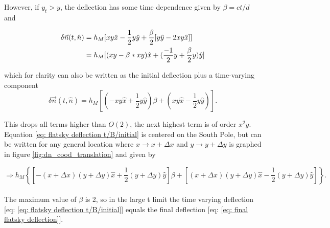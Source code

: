 \documentclass{article}
\begin{document}
However, if $y_t > y$, the deflection has some time dependence given by $\beta = ct/d$ and 

\begin{align}
    \delta\vec{n}(t,\hat{n}) &= h_M[xy\hat{x} - \frac{1}{2}y\hat{y} + \frac{\beta}{2}[y\hat{y}  - 2xy\hat{x}]] \notag \\
    &= h_M[(xy-\beta*xy)\hat{x} + (\frac{-1}{2}y + \frac{\beta}{2}y)\hat{y}] 
    \label{eq: flatsky deflection txy}
\end{align}

which for clarity can also be written as the initial deflection plus a time-varying component 
\begin{equation}
    \delta\vec{n}(t,\hat{n}) = h_M[(-xy\hat{x} + \frac{1}{2}y\hat{y})\beta + (xy\hat{x} - \frac{1}{2}y\hat{y})]. 
    \label{eq: flatsky deflection t/B/initial}
\end{equation}

This drops all terms higher than $O(2)$, the next highest term is of order $x^2y$. Equation \ref{eq: flatsky deflection t/B/initial} is centered on the South Pole, but can be written for any general location where $x \rightarrow x+\Delta x$ and $y \rightarrow y+\Delta y$ is graphed in figure \ref{fig:dn_cood_translation} and given by 

\begin{equation}
    \Rightarrow h_M\left\{\left[-(x+\Delta x)(y+\Delta y)\hat{x} + \frac{1}{2}(y+\Delta y)\hat{y}\right]\beta + \left[(x+\Delta x)(y+\Delta y)\hat{x} - \frac{1}{2}(y+\Delta y)\hat{y}\right]\right\}. 
    \label{eq: flatsky deflection cood translation}
\end{equation}
\\

The maximum value of $\beta$ is 2, so in the large t limit the time varying deflection [eq: \ref{eq: flatsky deflection t/B/initial}] equals the final deflection [eq: \ref{eq: final flatsky deflection}]. %
\end{document}
